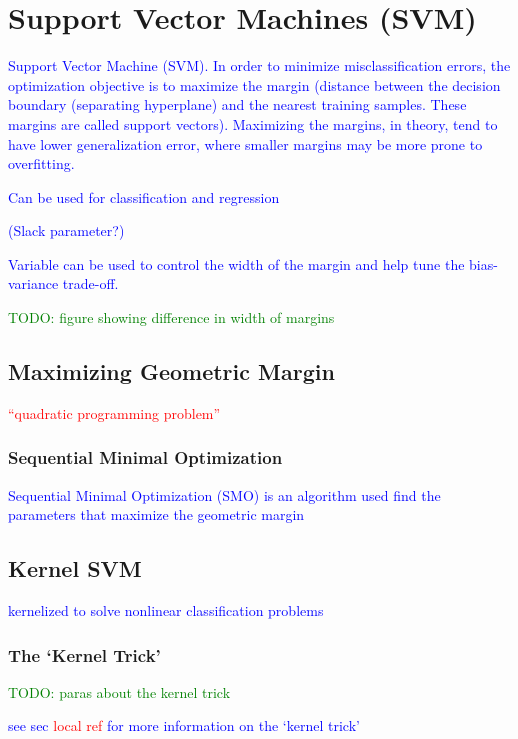 \section{Support Vector Machines (SVM)}

\textcolor{blue}{Support Vector Machine (SVM). In order to minimize misclassification errors, the optimization objective is to maximize the margin (distance between the decision boundary (separating hyperplane) and the nearest training samples. These margins are called support vectors). Maximizing the margins, in theory, tend to have lower generalization error, where smaller margins may be more prone to overfitting.}

\textcolor{blue}{Can be used for classification and regression}

\textcolor{blue}{(Slack parameter?)}

\textcolor{blue}{Variable can be used to control the width of the margin and help tune the bias-variance trade-off.}

\textcolor{green}{TODO: figure showing difference in width of margins}

\subsection{Maximizing Geometric Margin}

\textcolor{red}{``quadratic programming problem''}

\subsubsection{Sequential Minimal Optimization}

\textcolor{blue}{Sequential Minimal Optimization (SMO) is an algorithm used find the parameters that maximize the geometric margin}

\subsection{Kernel SVM}

\textcolor{blue}{kernelized to solve nonlinear classification problems}

\subsubsection{The `Kernel Trick'}

\textcolor{green}{TODO: paras about the kernel trick}

\textcolor{blue}{see sec \textcolor{red}{local ref} for more information on the `kernel trick'}

